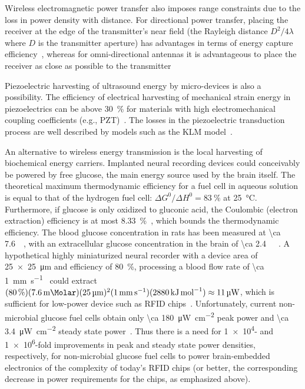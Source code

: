 Wireless electromagnetic power transfer also imposes range constraints due to the loss in power density with distance.
For directional power transfer, placing the receiver at the edge of the transmitter's near field (the Rayleigh distance $D^2/4\lambda$ where $D$ is the transmitter aperture) has advantages in terms of energy capture efficiency~\cite{ozeri10}, whereas for omni-directional antennas it is advantageous to place the receiver as close as possible to the transmitter

Piezoelectric harvesting of ultrasound energy by micro-devices is also a possibility. The efficiency of electrical harvesting of mechanical strain energy in piezoelectrics can be above \SI{30}{\percent} for materials with high electromechanical coupling coefficients (e.g., PZT)~\cite{safari08, xu12}. The losses in the piezoelectric transduction process are well described by models such as the KLM model~\cite{krimholtz70,castillo03}. 

An alternative to wireless energy transmission is the local harvesting of biochemical energy carriers. Implanted neural recording devices could conceivably be powered by free glucose, the main energy source used by the brain itself.
The theoretical maximum thermodynamic efficiency for a fuel cell in aqueous solution is equal to that of the hydrogen fuel cell: $\Delta G^0/\Delta H^0 = \SI{83}{\percent}$ at \SI{25}{\degreeCelsius}.
Furthermore, if glucose is only oxidized to gluconic acid, the Coulombic (electron extraction) efficiency is at most \SI{8.33}{\percent}~\cite{rapoport12}, which bounds the thermodynamic efficiency.
The blood glucose concentration in rats has been measured at \SI{\ca 7.6}{\milli\Molar}, with an extracellular glucose concentration in the brain of \SI{\ca 2.4}{\milli\Molar}~\cite{silver94}.
A hypothetical highly miniaturized neural recorder with a device area of \SI{25 x 25}{\micro\meter} and efficiency of \SI{80}{\percent}, processing a blood flow rate of \SI{\ca 1}{\milli\meter\per\second}~\cite{ivanov81} could extract $(\SI{80}{\percent})(\SI{7.6}{\milli\Molar})(\SI{25}{\micro\meter})^2(\SI{1}{\milli\meter\per\second})(\SI{2880}{\kilo\joule\per\mole})\approx \SI{11}{\micro\watt}$, which is sufficient for low-power device such as RFID chips~\cite{cho05}.
Unfortunately, current non-microbial glucose fuel cells obtain only \SI{\ca 180}{\micro\watt\per\centi\meter\squared} peak power and \SI{\ca 3.4}{\micro\watt\per\centi\meter\squared} steady state power~\cite{rapoport12}.
Thus there is a need for \num{1e4}- and \num{1e6}-fold improvements in peak and steady state power densities, respectively, for non-microbial glucose fuel cells to power brain-embedded electronics of the complexity of today's RFID chips (or better, the corresponding decrease in power requirements for the chips, as emphasized above).

